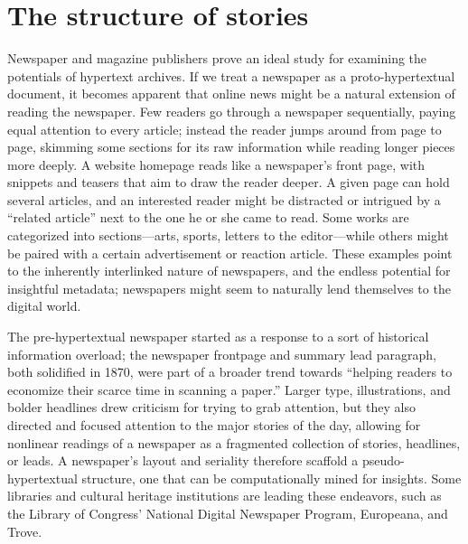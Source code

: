 \section{The structure of stories}



Newspaper and magazine publishers prove an ideal study for examining the potentials of hypertext archives. If we treat a newspaper as a proto-hypertextual document, it becomes apparent that online news might be a natural extension of reading the newspaper. Few readers go through a newspaper sequentially, paying equal attention to every article; instead the reader jumps around from page to page, skimming some sections for its raw information while reading longer pieces more deeply. A website homepage reads like a newspaper's front page, with snippets and teasers that aim to draw the reader deeper. A given page can hold several articles, and an interested reader might be distracted or intrigued by a ``related article'' next to the one he or she came to read. Some works are categorized into sections---arts, sports, letters to the editor---while others might be paired with a certain advertisement or reaction article. These examples point to the inherently interlinked nature of newspapers, and the endless potential for insightful metadata; newspapers might seem to naturally lend themselves to the digital world.

The pre-hypertextual newspaper started as a response to a sort of historical information overload; the newspaper frontpage and summary lead paragraph, both solidified in 1870, were part of a broader trend towards ``helping readers to economize their scarce time in scanning a paper.''\autocite[254]{starr_creation_2004} Larger type, illustrations, and bolder headlines drew criticism for trying to grab attention, but they also directed and focused attention to the major stories of the day, allowing for nonlinear readings of a newspaper as a fragmented collection of stories, headlines, or leads. A newspaper's layout and seriality therefore scaffold a pseudo-hypertextual structure, one that can be computationally mined for insights. Some libraries and cultural heritage institutions are leading these endeavors, such as the Library of Congress' National Digital Newspaper Program, Europeana, and Trove.\autocite{europeana,trove}


